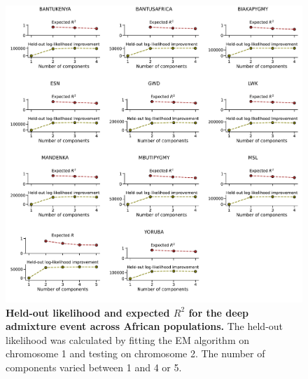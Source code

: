 \begin{figure}
    \centering
    \includegraphics[width=\textwidth]{figures/gb_deepadmix/gb_real_deep_2.pdf}
    \caption{\textbf{Held-out likelihood and expected $R^2$ for the deep admixture event across African populations.} The held-out likelihood was calculated by fitting the EM algorithm on chromosome 1 and testing on chromosome 2. The number of components varied between 1 and 4 or 5.}
    \label{fig:gb_deepadmix_cv_all}
\end{figure}

